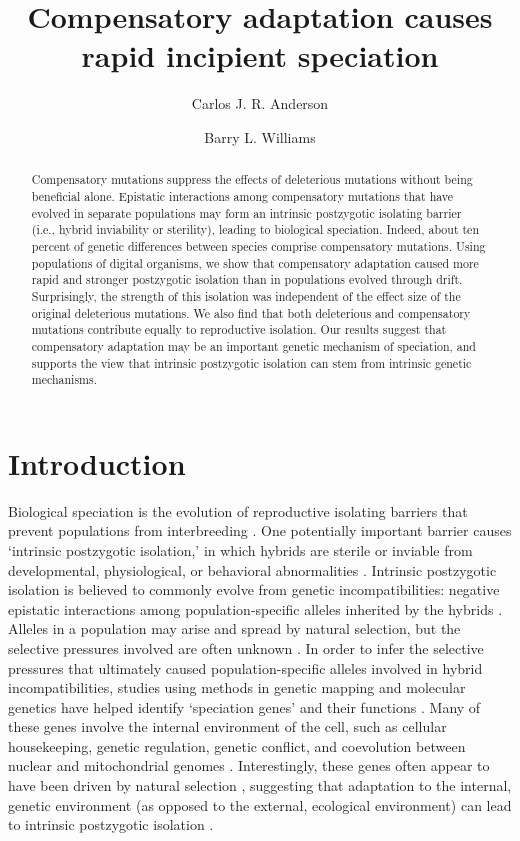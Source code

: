 \documentclass[12pt]{article}
\title{Compensatory adaptation causes rapid incipient speciation}
\author{Carlos J. R. Anderson \and Barry L. Williams}
\begin{document}
\maketitle

\begin{abstract}
Compensatory mutations suppress the effects of deleterious mutations
without being beneficial alone.
%
Epistatic interactions among compensatory mutations that have
evolved in separate populations may form an intrinsic
postzygotic isolating barrier (i.e., hybrid inviability or sterility),
leading to biological speciation.
%
Indeed, about ten percent of genetic differences between species
comprise compensatory mutations.
%
Using populations of digital organisms, we show that
compensatory adaptation caused more rapid and stronger
postzygotic isolation than in
populations evolved through drift.
%
Surprisingly, the strength of this isolation was independent
of the effect size of the original deleterious mutations.
%
We also find that
both deleterious and compensatory mutations
contribute equally to reproductive isolation.
%
Our results suggest that compensatory adaptation may be
an important genetic mechanism of speciation,
and supports the view that intrinsic postzygotic isolation
can stem from intrinsic genetic mechanisms.
\end{abstract}



\section*{Introduction}

Biological speciation is the evolution of reproductive isolating
barriers that prevent populations from interbreeding \cite{coy04}.
%
One potentially important barrier causes `intrinsic postzygotic isolation,'
in which hybrids are sterile or inviable from developmental, physiological,
or behavioral abnormalities \cite{coy04}.
%
Intrinsic postzygotic isolation is believed to commonly evolve
from genetic incompatibilities: negative epistatic interactions
among population-specific alleles inherited by the hybrids \cite{pre10}.
%
Alleles in a population may arise and spread by natural selection,
but the selective pressures involved are often unknown \cite{sch09}.
%
In order to infer the selective pressures that ultimately caused
population-specific alleles involved in hybrid incompatibilities,
studies using methods in genetic mapping and molecular genetics
have helped identify `speciation genes' and their functions
\cite{noo06,mah11}.
%
Many of these genes involve the internal environment of the cell,
such as cellular housekeeping, genetic regulation, genetic conflict,
and coevolution between nuclear and mitochondrial genomes \cite{noo06,wol10}.
%
Interestingly, these genes often appear to have been driven
by natural selection \cite{noo06}, suggesting that adaptation to the internal,
genetic environment (as opposed to the external, ecological environment)
can lead to intrinsic postzygotic isolation \cite{pha09,pre10}.
\end{document}
